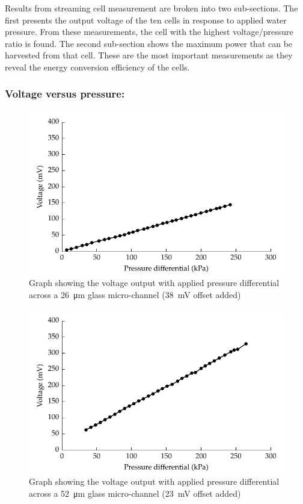     Results from streaming cell measurement are broken into two sub-sections.
    The first presents the output voltage of the ten cells in response to applied water pressure.
    From these measurements, the cell with the highest voltage/pressure ratio is found.
    The second sub-section shows the maximum power that can be harvested from that cell.
    These are the most important measurements as they reveal the energy conversion efficiency of the cells.


    \subsubsection*{Voltage versus pressure:}


      \begin{figure}[p]
          \centering
          \includegraphics{content/pt1/01-PowerHarvesting/graphics/streamingCell_voltVsPress_26um_out}
          \caption{\label{fig:VvsP_26um}Graph showing the voltage output with applied pressure differential across a \SI{26}{\micro\metre} glass micro-channel (\SI{38}{\milli\volt} offset added)}
      \end{figure}

      \begin{figure}
          \centering
          \includegraphics{content/pt1/01-PowerHarvesting/graphics/streamingCell_voltVsPress_52um_out}
          \caption{\label{fig:VvsP_52um}Graph showing the voltage output with applied pressure differential across a \SI{52}{\micro\metre} glass micro-channel (\SI{23}{\milli\volt} offset added)}
      \end{figure}

